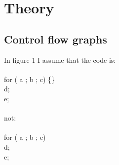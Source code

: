 \documentclass[a4paper]{article}
\date{}
\begin{document}
\thispagestyle{fancy}

\section{Theory}
\subsection{Control flow graphs}
    In figure 1 I assume that the code is:\\
    \\
    for ( a ; b ; c) \{\}\\
    d;\\
    e;\\
    \\
    not:\\
    \\
    for ( a ; b ; c)\\
    \phantom{x}\hspace{1 em} d;\\
    e;\\
\end{document}
